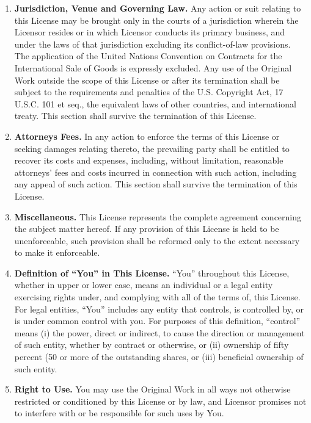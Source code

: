 \documentclass[letterpaper,10pt,titlepage]{custbook}
\begin{document}
\begin{it}
\begin{enumerate}
\item \textbf{Jurisdiction, Venue and Governing Law.}  Any action or suit relating to this 
      License may be brought only in the courts of a jurisdiction wherein the Licensor 
      resides or in which Licensor conducts its primary business, and under the laws
      of that jurisdiction excluding its conflict-of-law provisions. The application 
      of the United Nations Convention on Contracts for the International Sale of Goods 
      is expressly excluded. Any use of the Original Work outside the scope of this 
      License or after its termination shall be subject to the requirements and 
      penalties of the U.S. Copyright Act, 17 U.S.C. 101 et seq., the equivalent 
      laws of other countries, and international treaty. This section shall 
      survive the termination of this License. 

\item \textbf{Attorneys Fees.}  In any action to enforce the terms of this License or 
      seeking damages relating thereto, the prevailing party shall be entitled 
      to recover its costs and expenses, including, without limitation, reasonable 
      attorneys' fees and costs incurred in connection with such action, including
      any appeal of such action. This section shall survive the termination of 
      this License. 

\item \textbf{Miscellaneous.} This License represents the complete agreement 
      concerning the subject matter hereof. If any provision of this License 
      is held to be unenforceable, such provision shall be reformed only to 
      the extent necessary to make it enforceable. 

\item \textbf{Definition of ``You'' in This License.} ``You'' throughout this License, 
      whether in upper or lower case, means an individual or a legal entity 
      exercising rights under, and complying with all of the terms of, this 
      License. For legal entities, ``You'' includes any entity that controls, 
      is controlled by, or is under common control with you. For purposes of 
      this definition, ``control'' means (i) the power, direct or indirect, 
      to cause the direction or management of such entity, whether by 
      contract or otherwise, or (ii) ownership of fifty percent (50%
      or more of the outstanding shares, or (iii) beneficial ownership 
      of such entity. 

\item \textbf{Right to Use.}  You may use the Original Work in all ways not 
      otherwise restricted or conditioned by this License or by law, 
      and Licensor promises not to interfere with or be responsible 
      for such uses by You. 
\end{enumerate}
\end{it}
\end{document}
